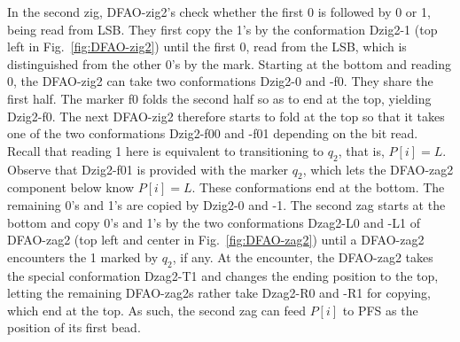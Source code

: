 In the second zig, DFAO-zig2's check whether the first 0 is followed by 0 or 1, being read from LSB.
They first copy the 1's by the conformation Dzig2-1 (top left in Fig.~\ref{fig:DFAO-zig2}) until the first 0, read from the LSB, which is distinguished from the other 0's by the mark. 
Starting at the bottom and reading 0, the DFAO-zig2 can take two conformations Dzig2-0 and -f0.
They share the first half.
The marker f0 folds the second half so as to end at the top, yielding Dzig2-f0. 
The next DFAO-zig2 therefore starts to fold at the top so that it takes one of the two conformations Dzig2-f00 and -f01 depending on the bit read.
Recall that reading 1 here is equivalent to transitioning to $q_2$, that is, $P[i] = L$.
Observe that Dzig2-f01 is provided with the marker $q_2$, which lets the DFAO-zag2 component below know $P[i] = L$. 
These conformations end at the bottom.
The remaining 0's and 1's are copied by Dzig2-0 and -1.
The second zag starts at the bottom and copy 0's and 1's by the two conformations Dzag2-L0 and -L1 of DFAO-zag2 (top left and center in Fig.~\ref{fig:DFAO-zag2}) until a DFAO-zag2 encounters the 1 marked by $q_2$, if any. 
At the encounter, the DFAO-zag2 takes the special conformation Dzag2-T1 and changes the ending position to the top, letting the remaining DFAO-zag2s rather take Dzag2-R0 and -R1 for copying, which end at the top.
As such, the second zag can feed $P[i]$ to PFS as the position of its first bead.





